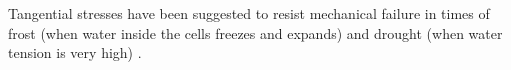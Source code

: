Tangential stresses have been suggested to resist mechanical failure in times of
frost (when water inside the cells freezes and expands) and drought (when water
tension is very high) \citep{kubler1983mechanism}.